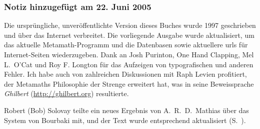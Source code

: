 \subsubsection{Notiz hinzugefügt am 22. Juni 2005}\label{note2002}

Die ursprüngliche, unveröffentlichte Version dieses Buches wurde 1997 geschrieben und über das Internet verbreitet.  Die vorliegende Ausgabe wurde aktualisiert, um das aktuelle Metamath-Programm und die Datenbasen sowie aktuellere {\sc url}s für Internet-Seiten wiederzugeben.  Dank an Josh Purinton, One Hand Clapping, Mel L.\ O'Cat und Roy F. Longton für das Aufzeigen von typografischen und anderen Fehler.  Ich habe auch von zahlreichen Diskussionen mit Raph Levien profitiert, der Metamaths Philosophie der Strenge erweitert hat, was in seine Beweissprache {\em Ghilbert} (\url{http://ghilbert.org}) resultierte.

Robert (Bob) Solovay teilte ein neues Ergebnis von A.~R.~D.~Mathias über das System von Bourbaki mit, und der Text wurde entsprechend aktualisiert (S.~\pageref{bourbaki}).

